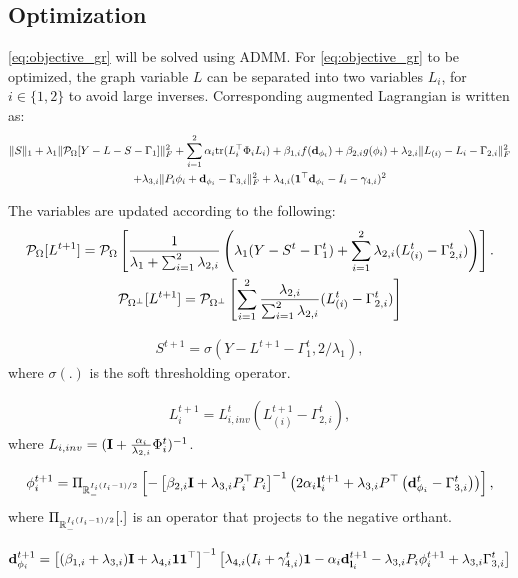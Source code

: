\documentclass{article}
\begin{document}
\subsection{Optimization}
\eqref{eq:objective_gr} will be solved using ADMM. For \eqref{eq:objective_gr} to be optimized, the graph variable $L$ can be separated into two variables $L_i$, for $i\in\{1,2\}$ to avoid large inverses. Corresponding augmented Lagrangian is written as:
\begin{gather}
    \|S\|_1+\lambda_1\|\P_{\Omega}[Y - L - S-\Gamma_1]\|_F^2 + \sum_{i=1}^2\alpha_{i}\mathrm{tr}(L_{i}^\top \Phi_i L_{i}) + \beta_{1,i}f(\d_{\phi_i})+\beta_{2,i}g(\phi_i)+\lambda_{2,i}\|L_{(i)}-L_i-\Gamma_{2,i}\|_F^2\nonumber\\
    + \lambda_{3,i}\|P_i\phi_{i}+\d_{\phi_i}-\Gamma_{3,i}\|_F^2+ \lambda_{4,i}(\mathbf{1}^\top \d_{\phi_i}-I_i-\gamma_{4,i})^2
\end{gather}

The variables are updated according to the following:
\begin{gather}
    \P_{\Omega}[L^{t+1}] = \P_{\Omega}\left[\frac{1}{\lambda_1+\sum_{i=1}^2\lambda_{2,i}} \left( \lambda_1(Y-S^t-\Gamma_1^t)+\sum_{i=1}^2\lambda_{2,i}(L_{(i)}^t-\Gamma_{2,i}^t)\right)\right]. \\
    \P_{\Omega^\perp}[L^{t+1}] = \P_{\Omega^\perp}\left[\sum_{i=1}^2\frac{\lambda_{2,i}}{\sum_{i=1}^2\lambda_{2,i}}(L_{(i)}^t-\Gamma_{2,i}^t)\right]
\end{gather}

\begin{gather}
    S^{t+1} = \sigma(Y-L^{t+1}-\Gamma_1^t, 2/\lambda_1),
\end{gather}
where $\sigma(.)$ is the soft thresholding operator.

\begin{gather}
    L_i^{t+1} = L_{i,inv}^t(L_{(i)}^{t+1}-\Gamma_{2,i}^t),
\end{gather}
where $L_{i,inv} = (\I+\frac{\alpha_i}{\lambda_{2,i}}\Phi_i^t)^{-1}$.


\begin{gather}
    \phi_i^{t+1} = \Pi_{\R^{I_i(I_i-1)/2}_{-}}\left[ -\left[\beta_{2,i}\I+\lambda_{3,i}P_{i}^\top P_i\right]^{-1}\left(2\alpha_i\l_i^{t+1}+\lambda_{3,i}P^\top\left(\d_{\phi_i}^t-\Gamma_{3,i}^t\right)\right) \right],
\end{gather}
where $\Pi_{\R^{I_i(I_i-1)/2}_{-}}[.]$ is an operator that projects to the negative orthant.

\begin{gather}
    \d_{\phi_i}^{t+1} = \left[(\beta_{1,i}+\lambda_{3,i})\I+\lambda_{4,i}\mathbf{1}\mathbf{1}^\top\right]^{-1}\left[\lambda_{4,i}(I_i+\gamma_{4,i}^t)\mathbf{1}-\alpha_{i}\d_{\l_i}^{t+1}-\lambda_{3,i}P_{i}\phi_{i}^{t+1}+\lambda_{3,i}\Gamma_{3,i}^t\right]
\end{gather}
\end{document}

